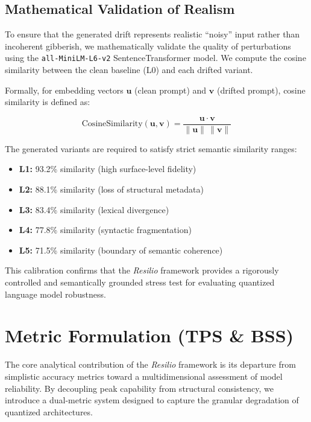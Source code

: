 \documentclass[conference]{IEEEtran}
\begin{document}
\subsection{Mathematical Validation of Realism}

To ensure that the generated drift represents realistic ``noisy'' input rather than incoherent gibberish, we mathematically validate the quality of perturbations using the \texttt{all-MiniLM-L6-v2} SentenceTransformer model. We compute the cosine similarity between the clean baseline (L0) and each drifted variant.

Formally, for embedding vectors $\mathbf{u}$ (clean prompt) and $\mathbf{v}$ (drifted prompt), cosine similarity is defined as:

\begin{equation}
\text{CosineSimilarity}(\mathbf{u}, \mathbf{v}) =
\frac{\mathbf{u} \cdot \mathbf{v}}{\|\mathbf{u}\| \, \|\mathbf{v}\|}
\end{equation}

The generated variants are required to satisfy strict semantic similarity ranges:

\begin{itemize}
\item \textbf{L1:} 93.2\% similarity (high surface-level fidelity)
\item \textbf{L2:} 88.1\% similarity (loss of structural metadata)
\item \textbf{L3:} 83.4\% similarity (lexical divergence)
\item \textbf{L4:} 77.8\% similarity (syntactic fragmentation)
\item \textbf{L5:} 71.5\% similarity (boundary of semantic coherence)
\end{itemize}

This calibration confirms that the \textit{Resilio} framework provides a rigorously controlled and semantically grounded stress test for evaluating quantized language model robustness.

\section{Metric Formulation (TPS \& BSS)}

The core analytical contribution of the \textit{Resilio} framework is its departure from simplistic accuracy metrics toward a multidimensional assessment of model reliability. By decoupling peak capability from structural consistency, we introduce a dual-metric system designed to capture the granular degradation of quantized architectures.
\end{document}
